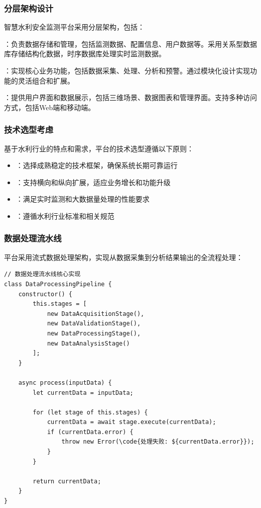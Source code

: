 \hypertarget{ux5206ux5c42ux67b6ux6784ux8bbeux8ba1}{%
\subsubsection{分层架构设计}\label{ux5206ux5c42ux67b6ux6784ux8bbeux8ba1}}

智慧水利安全监测平台采用分层架构，包括：

：负责数据存储和管理，包括监测数据、配置信息、用户数据等。采用关系型数据库存储结构化数据，时序数据库处理实时监测数据。

：实现核心业务功能，包括数据采集、处理、分析和预警。通过模块化设计实现功能的灵活组合和扩展。

：提供用户界面和数据展示，包括三维场景、数据图表和管理界面。支持多种访问方式，包括Web端和移动端。

\hypertarget{ux6280ux672fux9009ux578bux8003ux8651}{%
\subsubsection{技术选型考虑}\label{ux6280ux672fux9009ux578bux8003ux8651}}

基于水利行业的特点和需求，平台的技术选型遵循以下原则：

\begin{itemize}
\tightlist
\item
  ：选择成熟稳定的技术框架，确保系统长期可靠运行
\item
  ：支持横向和纵向扩展，适应业务增长和功能升级
\item
  ：满足实时监测和大数据量处理的性能要求
\item
  ：遵循水利行业标准和相关规范
\end{itemize}

\hypertarget{ux6570ux636eux5904ux7406ux6d41ux6c34ux7ebf}{%
\subsubsection{数据处理流水线}\label{ux6570ux636eux5904ux7406ux6d41ux6c34ux7ebf}}

平台采用流式数据处理架构，实现从数据采集到分析结果输出的全流程处理：

\begin{lstlisting}[style=javascript]
// 数据处理流水线核心实现
class DataProcessingPipeline {
    constructor() {
        this.stages = [
            new DataAcquisitionStage(),
            new DataValidationStage(),
            new DataProcessingStage(),
            new DataAnalysisStage()
        ];
    }
    
    async process(inputData) {
        let currentData = inputData;
        
        for (let stage of this.stages) {
            currentData = await stage.execute(currentData);
            if (currentData.error) {
                throw new Error(\code{处理失败: ${currentData.error}});
            }
        }
        
        return currentData;
    }
}
\end{lstlisting}


